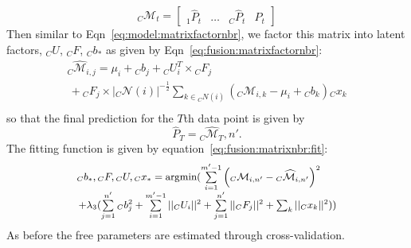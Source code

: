 \vspace{-1em}
\begin{equation}
  \label{eq:fusion:predictionmatrix}
  {}_C\mathcal{M}_{t} = \left[\begin{array}{llll}
      {}_1\widehat{P}_{t}& \dots & {}_C\widehat{P}_t & P_t 
    \end{array}
  \right]
\end{equation}
Then similar to Eqn~\ref{eq:model:matrixfactornbr}, we 
factor this matrix into latent factors, ${}_C U$, ${}_C F$, ${}_C b_*$ as 
given by Eqn~\ref{eq:fusion:matrixfactornbr}:
\begin{equation}
  \label{eq:fusion:matrixfactornbr}
  \begin{array}{l}
    {}_C \widehat{\mathcal{M}}_{i,j} =  \mu_i + {}_C b_{j} + {}_C U_i^T\times {}_C F_j \\
                                \, + {}_C F_j \times |{}_C \mathcal{N}(i)|^{-\frac{1}{2}}
    \sum_{k \in {}_C N(i)} ({}_C\mathcal{M}_{i,k} - \mu_i + {}_C b_{k}) {}_Cx_k \\
  \end{array}
\end{equation}
so that the final prediction for the
$T$th data point is given by
\[\widehat{P}_T = {}_C \widehat{\mathcal{M}}_T,n'.\]
The fitting function is given by equation~\ref{eq:fusion:matrixnbr:fit}:
\begin{equation}
  \small
  \label{eq:fusion:matrixnbr:fit}
  \begin{array}{l}
    {}_C b_*, {}_C F, {}_C U, {}_C x_*  = \textrm{argmin} (\sum \limits_{i=1}^{m'-1} \left({}_C \mathcal{M}_{i,n'} - {}_C \widehat{\mathcal{M}}_{i,n'}   \right)^2 \\
     \, + \lambda_3 (\sum \limits_{j=1}^{n'}{}_C b_j^2 + \sum \limits_{i=1}^{m'-1} ||{}_C U_i||^2 
     + \sum \limits_{j=1}^{n'} ||{}_C F_j||^2 + \sum_k ||{}_C x_k||^2))
  \end{array}
\end{equation}
\noindent
As before the free parameters are estimated through cross-validation.


